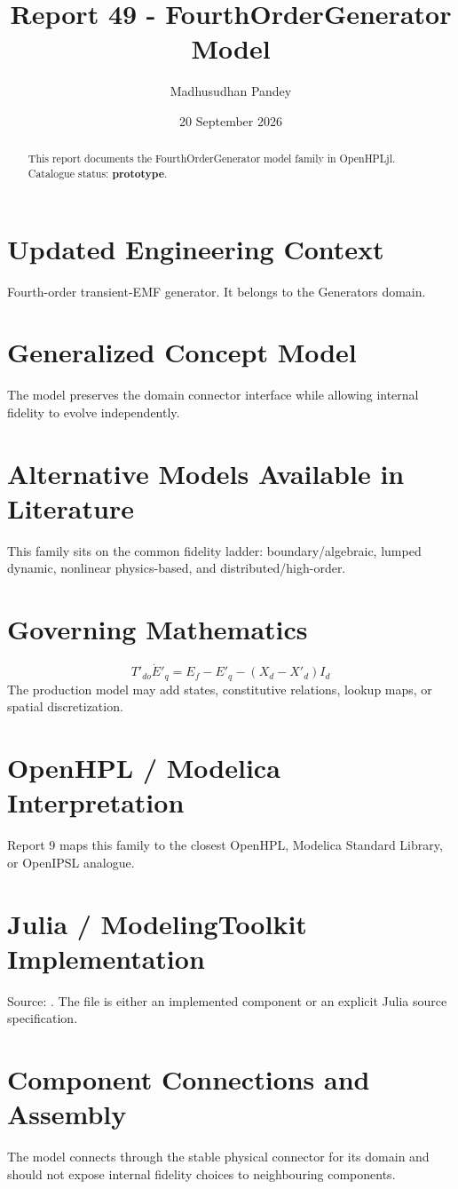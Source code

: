 \documentclass[10pt,a4paper]{article}
\title{Report 49 - FourthOrderGenerator Model}
\author{Madhusudhan Pandey}
\date{20 September 2026}
\begin{document}
\maketitle
\begin{abstract}This report documents the FourthOrderGenerator model family in OpenHPLjl. Catalogue status: \textbf{prototype}.\end{abstract}
\section{Updated Engineering Context}Fourth-order transient-EMF generator. It belongs to the Generators domain.
\section{Generalized Concept Model}The model preserves the domain connector interface while allowing internal fidelity to evolve independently.
\section{Alternative Models Available in Literature}This family sits on the common fidelity ladder: boundary/algebraic, lumped dynamic, nonlinear physics-based, and distributed/high-order.
\section{Governing Mathematics}\[T'_{do}\dot E'_q=E_f-E'_q-(X_d-X'_d)I_d\]The production model may add states, constitutive relations, lookup maps, or spatial discretization.
\section{OpenHPL / Modelica Interpretation}Report 9 maps this family to the closest OpenHPL, Modelica Standard Library, or OpenIPSL analogue.
\section{Julia / ModelingToolkit Implementation}Source: \texttt{}. The file is either an implemented component or an explicit Julia source specification.
\section{Component Connections and Assembly}The model connects through the stable physical connector for its domain and should not expose internal fidelity choices to neighbouring components.
\end{document}
